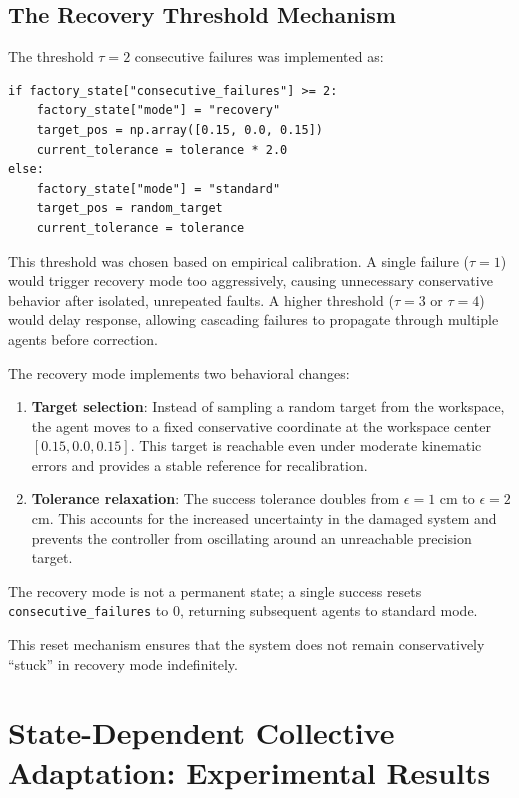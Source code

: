 \documentclass[12pt,a4paper,oneside]{report}
\begin{document}
\subsection{The Recovery Threshold Mechanism}

The threshold $\tau = 2$ consecutive failures was implemented as:
\begin{verbatim}
if factory_state["consecutive_failures"] >= 2:
    factory_state["mode"] = "recovery"
    target_pos = np.array([0.15, 0.0, 0.15])
    current_tolerance = tolerance * 2.0
else:
    factory_state["mode"] = "standard"
    target_pos = random_target
    current_tolerance = tolerance
\end{verbatim}

This threshold was chosen based on empirical calibration. A single failure ($\tau = 1$) would trigger recovery mode too aggressively, causing unnecessary conservative behavior after isolated, unrepeated faults. A higher threshold ($\tau = 3$ or $\tau = 4$) would delay response, allowing cascading failures to propagate through multiple agents before correction.

The recovery mode implements two behavioral changes:
\begin{enumerate}
    \item \textbf{Target selection}: Instead of sampling a random target from the workspace, the agent moves to a fixed conservative coordinate at the workspace center $[0.15, 0.0, 0.15]$. This target is reachable even under moderate kinematic errors and provides a stable reference for recalibration.
    \item \textbf{Tolerance relaxation}: The success tolerance doubles from $\epsilon = 1$ cm to $\epsilon = 2$ cm. This accounts for the increased uncertainty in the damaged system and prevents the controller from oscillating around an unreachable precision target.
\end{enumerate}

\begin{sloppypar}
The recovery mode is not a permanent state; a single success resets \texttt{consecutive\_failures} to 0, returning subsequent agents to standard mode.
\end{sloppypar}
This reset mechanism ensures that the system does not remain conservatively ``stuck'' in recovery mode indefinitely.

\section{State-Dependent Collective Adaptation: Experimental Results}
\end{document}
